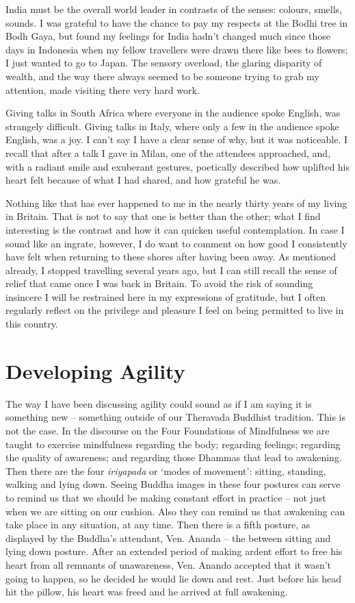 India must be the overall world leader in contrasts of the senses:
colours, smells, sounds. I was grateful to have the chance to pay my
respects at the Bodhi tree in Bodh Gaya, but found my feelings for India
hadn't changed much since those days in Indonesia when my fellow
travellers were drawn there like bees to flowers; I just wanted
to go to Japan. The sensory overload, the glaring disparity of wealth,
and the way there always seemed to be someone trying to grab my
attention, made visiting there very hard work.

Giving talks in South Africa where everyone in the audience spoke
English, was strangely difficult. Giving talks in Italy, where only a
few in the audience spoke English, was a joy. I can't say I have a clear
sense of why, but it was noticeable. I recall that after a talk I gave
in Milan, one of the attendees approached, and, with a radiant smile and
exuberant gestures, poetically described how uplifted his heart felt
because of what I had shared, and how grateful he was.

Nothing like that has ever happened to me in the nearly thirty years of
my living in Britain. That is not to say that one is better than the
other; what I find interesting is the contrast and how it can quicken
useful contemplation. In case I sound like an ingrate, however, I do
want to comment on how good I consistently have felt when returning to
these shores after having been away. As mentioned already, I stopped
travelling several years ago, but I can still recall the sense of relief
that came once I was back in Britain. To avoid the risk of sounding
insincere I will be restrained here in my expressions of gratitude, but
I often regularly reflect on the privilege and pleasure I feel on being
permitted to live in this country.

\section{Developing Agility}

The way I have been discussing agility could sound as if I am saying it
is something new -- something outside of our Theravada Buddhist
tradition. This is not the case. In the discourse on the Four
Foundations of Mindfulness we are taught to exercise mindfulness
regarding the body; regarding feelings; regarding the quality of
awareness; and regarding those Dhammas that lead to awakening. Then
there are the four \emph{iriyapada} or `modes of movement': sitting,
standing, walking and lying down. Seeing Buddha images in these four
postures can serve to remind us that we should be making constant effort
in practice -- not just when we are sitting on our cushion. Also they
can remind us that awakening can take place in any situation, at any
time. Then there is a fifth posture, as displayed by the Buddha's
attendant, Ven. Ananda -- the between sitting and lying down posture.
After an extended period of making ardent effort to free his heart from
all remnants of unawareness, Ven. Anando accepted that it wasn't going
to happen, so he decided he would lie down and rest. Just before his
head hit the pillow, his heart was freed and he arrived at full
awakening.

